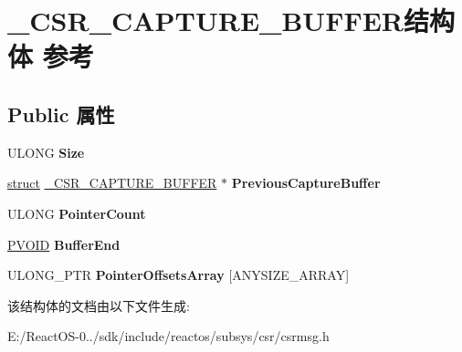 \hypertarget{struct___c_s_r___c_a_p_t_u_r_e___b_u_f_f_e_r}{}\section{\+\_\+\+C\+S\+R\+\_\+\+C\+A\+P\+T\+U\+R\+E\+\_\+\+B\+U\+F\+F\+E\+R结构体 参考}
\label{struct___c_s_r___c_a_p_t_u_r_e___b_u_f_f_e_r}
\subsection*{Public 属性}
\begin{DoxyCompactItemize}
\item 
\mbox{\label{struct___c_s_r___c_a_p_t_u_r_e___b_u_f_f_e_r_aef30e01d2a1266280da8f50a4d874a05}} 
U\+L\+O\+NG {\bfseries Size}
\item 
\mbox{\label{struct___c_s_r___c_a_p_t_u_r_e___b_u_f_f_e_r_ac6c9fa852774181c2f85f1344945eeac}} 
\hyperlink{interfacestruct}{struct} \hyperlink{struct___c_s_r___c_a_p_t_u_r_e___b_u_f_f_e_r}{\+\_\+\+C\+S\+R\+\_\+\+C\+A\+P\+T\+U\+R\+E\+\_\+\+B\+U\+F\+F\+ER} $\ast$ {\bfseries Previous\+Capture\+Buffer}
\item 
\mbox{\label{struct___c_s_r___c_a_p_t_u_r_e___b_u_f_f_e_r_a312f021776ac7cf5a82c6ec8b0c45840}} 
U\+L\+O\+NG {\bfseries Pointer\+Count}
\item 
\mbox{\label{struct___c_s_r___c_a_p_t_u_r_e___b_u_f_f_e_r_a8fe0e28e6057d52c1472e5ee18eb9d42}} 
\hyperlink{interfacevoid}{P\+V\+O\+ID} {\bfseries Buffer\+End}
\item 
\mbox{\label{struct___c_s_r___c_a_p_t_u_r_e___b_u_f_f_e_r_a7747d5e6906efd3300c3515f1366dd7d}} 
U\+L\+O\+N\+G\+\_\+\+P\+TR {\bfseries Pointer\+Offsets\+Array} \mbox{[}A\+N\+Y\+S\+I\+Z\+E\+\_\+\+A\+R\+R\+AY\mbox{]}
\end{DoxyCompactItemize}


该结构体的文档由以下文件生成\+:\begin{DoxyCompactItemize}
\item 
E\+:/\+React\+O\+S-\/0../sdk/include/reactos/subsys/csr/csrmsg.\+h\end{DoxyCompactItemize}
